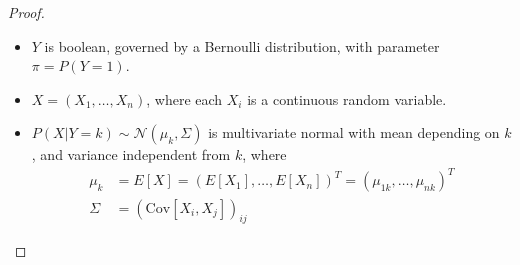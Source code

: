 \documentclass[12pt]{article}
\begin{document}
\begin{proof}
  \begin{itemize}
  \item
    $Y$ is boolean, governed by a Bernoulli distribution, with parameter $\pi = P(Y = 1)$.
  \item
    $X = (X_1, \dots, X_n)$, where each $X_i$ is a continuous random variable.
  \item
    $P(X | Y=k) \sim \mathcal{N}(\mu_{k}, \Sigma)$ is multivariate normal with mean depending on $k$, and variance independent from $k$, where
    \begin{align*}
      \mu_k
      &= E[X] = (E[X_1], \dots, E[X_n])^T = (\mu_{1k}, \dots, \mu_{nk})^T \\
      \Sigma
      &= (\text{Cov}[X_i, X_j])_{ij}
    \end{align*}
  \end{itemize}  
\end{proof}
\end{document}
